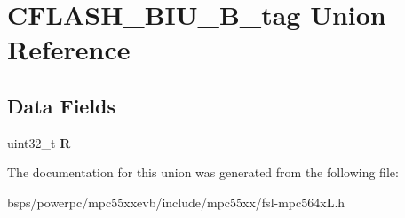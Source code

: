 \hypertarget{unionCFLASH__BIU__32B__tag}{}\section{C\+F\+L\+A\+S\+H\+\_\+\+B\+I\+U\+\_\+B\+\_\+tag Union Reference}
\label{unionCFLASH__BIU__32B__tag}
\subsection*{Data Fields}
\begin{DoxyCompactItemize}
\item 
\mbox{\label{unionCFLASH__BIU__32B__tag_a13aa4fe1122eb148abc2b38ad3b4b4f6}} 
uint32\+\_\+t {\bfseries R}
\end{DoxyCompactItemize}


The documentation for this union was generated from the following file\+:\begin{DoxyCompactItemize}
\item 
bsps/powerpc/mpc55xxevb/include/mpc55xx/fsl-\/mpc564x\+L.\+h\end{DoxyCompactItemize}
